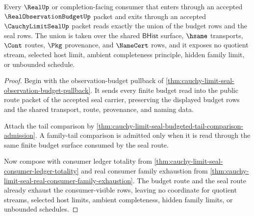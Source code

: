 \begin{theorem}
\label{thm:cauchy-limit-seal-real-observation-budget-consumer-package}
Every $\RealUp$ or completion-facing consumer that enters through an accepted $\RealObservationBudgetUp$ packet and exits through an accepted $\CauchyLimitSealUp$ packet reads exactly the union of the budget rows and the seal rows. The union is taken over the shared $\mathsf{BHist}$ surface, $\hsame$ transports, $\Cont$ routes, $\Pkg$ provenance, and $\NameCert$ rows, and it exposes no quotient stream, selected host limit, ambient completeness principle, hidden family limit, or unbounded schedule.
\end{theorem}
\begin{proof}
Begin with the observation-budget pullback of \autoref{thm:cauchy-limit-seal-observation-budget-pullback}. It sends every finite budget read into the public route packet of the accepted seal carrier, preserving the displayed budget rows and the shared transport, route, provenance, and naming data.

Attach the tail comparison by \autoref{thm:cauchy-limit-seal-budgeted-tail-comparison-admission}. A family-tail comparison is admitted only when it is read through the same finite budget surface consumed by the seal route.

Now compose with consumer ledger totality from \autoref{thm:cauchy-limit-seal-consumer-ledger-totality} and real consumer family exhaustion from \autoref{thm:cauchy-limit-seal-real-consumer-family-exhaustion}. The budget route and the seal route already exhaust the consumer-visible rows, leaving no coordinate for quotient streams, selected host limits, ambient completeness, hidden family limits, or unbounded schedules.
\end{proof}

